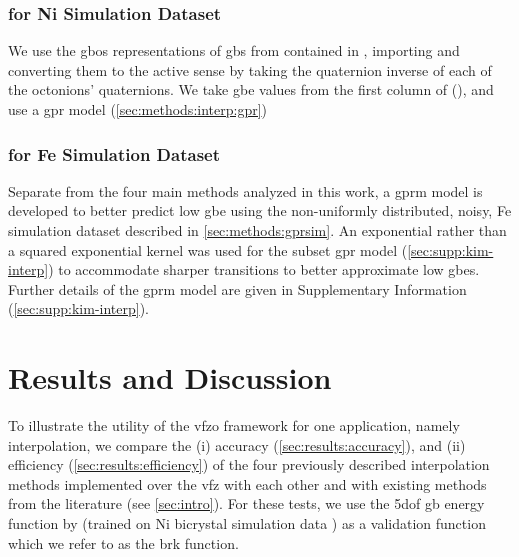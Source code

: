\documentclass[final,twocolumn,12pt]{elsarticle}
\begin{document}
\subsubsection{ for Ni Simulation Dataset}
\label{sec:methods:gprsim-Ni}

We use the \glspl{gbo} representations \cite{chesserLearningGrainBoundary2020} of \glspl{gb} from \cite{olmstedSurveyComputedGrain2009} contained in  \cite{chesserGBOctonionCode2019}, importing and converting them to the active sense by taking the quaternion inverse of each of the octonions' quaternions. We take \gls{gbe} values from the first column of  (\cite{chesserGBOctonionCode2019}), and use a \gls{gpr} model (\cref{sec:methods:interp:gpr})

\subsubsection{ for Fe Simulation Dataset}
\label{sec:methods:gprmix}
Separate from the four main methods analyzed in this work, a \gls{gprm} model is developed to better predict low \gls{gbe} using the non-uniformly distributed, noisy, Fe simulation dataset described in \cref{sec:methods:gprsim}. An exponential rather than a squared exponential kernel was used for the subset \gls{gpr} model (\cref{sec:supp:kim-interp}) to accommodate sharper transitions to better approximate low \glspl{gbe}.  Further details of the \gls{gprm} model are given in Supplementary Information (\cref{sec:supp:kim-interp}).

\section{Results and Discussion} \label{sec:results}

To illustrate the utility of the \gls{vfzo} framework for one application, namely interpolation, we compare the (i) accuracy (\cref{sec:results:accuracy}), and (ii) efficiency (\cref{sec:results:efficiency}) of the four previously described interpolation methods implemented over the \gls{vfz} with each other and with existing methods from the literature (see \cref{sec:intro}). For these tests, we use the \gls{5dof} \gls{gb} energy function by \citet{bulatovGrainBoundaryEnergy2014} (trained on Ni bicrystal simulation data \cite{olmstedSurveyComputedGrain2009}) as a validation function which we refer to as the \gls{brk} function. 
\end{document}
